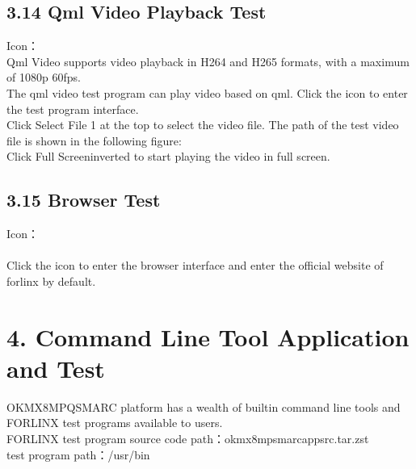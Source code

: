 \documentclass[letterpaper,10pt,openany,english]{sphinxmanual}
\begin{document}
\section{3.14 Qml Video Playback Test}
\label{\detokenize{linux-manual:qml-video-playback-test}}
\sphinxAtStartPar
Icon：\\
Qml Video supports video playback in H264 and H265 formats, with a maximum of 1080p 60fps.\\
The qml video test program can play video based on qml. Click the icon to enter the test program interface.\\
Click Select File 1 at the top to select the video file. The path of the test video file is shown in the following figure:\\
Click Full Screen\sphinxhyphen{}inverted to start playing the video in full screen.


\section{3.15 Browser Test}
\label{\detokenize{linux-manual:browser-test}}
\sphinxAtStartPar
Icon：\\
\\
Click the icon to enter the browser interface and enter the official website of forlinx by default.


\chapter{4. Command Line Tool Application and Test}
\label{\detokenize{linux-manual:command-line-tool-application-and-test}}
\sphinxAtStartPar
OK\sphinxhyphen{}MX8MPQ\sphinxhyphen{}SMARC platform has a wealth of built\sphinxhyphen{}in command line tools and FORLINX test programs available to users.\\
FORLINX test program source code path：okmx8mp\sphinxhyphen{}smarc\sphinxhyphen{}appsrc.tar.zst\\
test program path：/usr/bin
\end{document}
